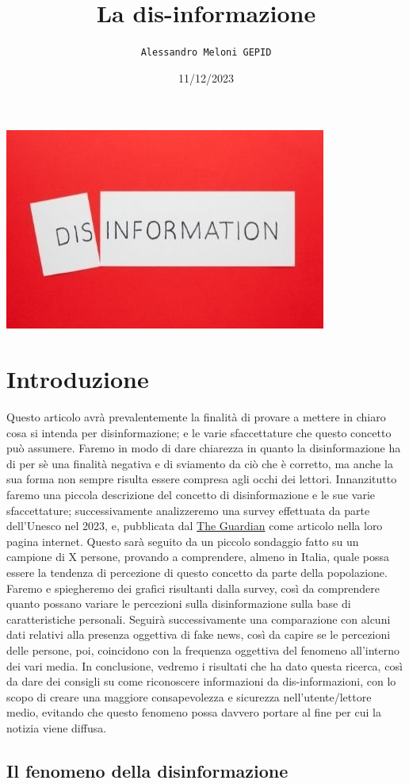 \documentclass{article}
\title{\textbf{La dis-informazione}}
\author{\texttt{Alessandro Meloni GEPID}}
\date{11/12/2023}
\begin{document}
\maketitle
    \includegraphics[width = 0.6\linewidth]{Immagini/disinformation.jpeg}
\centering \tableofcontents
\newpage \section{Introduzione}
\flushleft
\begin{justify}
    Questo articolo avrà prevalentemente la finalità di provare a mettere in chiaro cosa si intenda per disinformazione; e le varie sfaccettature che questo concetto può assumere.
    Faremo in modo di dare chiarezza in quanto la disinformazione ha di per sè una finalità negativa e di sviamento da ciò che è corretto, ma anche la sua forma non sempre risulta essere compresa agli occhi dei lettori.
    Innanzitutto faremo una piccola descrizione del concetto di disinformazione e le sue varie sfaccettature; successivamente analizzeremo una survey effettuata da parte dell'Unesco nel 2023, e, pubblicata dal \href{https://www.theguardian.com/technology/2023/nov/07/85-of-people-worry-about-online-disinformation-global-survey-finds}{The Guardian} come articolo nella loro pagina internet. Questo sarà seguito da un piccolo sondaggio fatto su un campione di X persone, provando a comprendere, almeno in Italia, quale possa essere la tendenza di percezione di questo concetto da parte della popolazione.
    Faremo e spiegheremo dei grafici risultanti dalla survey, così da comprendere quanto possano variare le percezioni sulla disinformazione sulla base di caratteristiche personali. 
    Seguirà successivamente una comparazione con alcuni dati relativi alla presenza oggettiva di fake news, così da capire se le percezioni delle persone, poi, coincidono con la frequenza oggettiva del fenomeno all'interno dei vari media.
    In conclusione, vedremo i risultati che ha dato questa ricerca, così da dare dei consigli su come riconoscere informazioni da dis-informazioni, con lo scopo di creare una maggiore consapevolezza e sicurezza nell'utente/lettore medio, evitando che questo fenomeno possa davvero portare al fine per cui la notizia viene diffusa.
    
\end{justify}
\begin{center}
\newpage \section{Il fenomeno della disinformazione}
\end{center}
\end{document}
